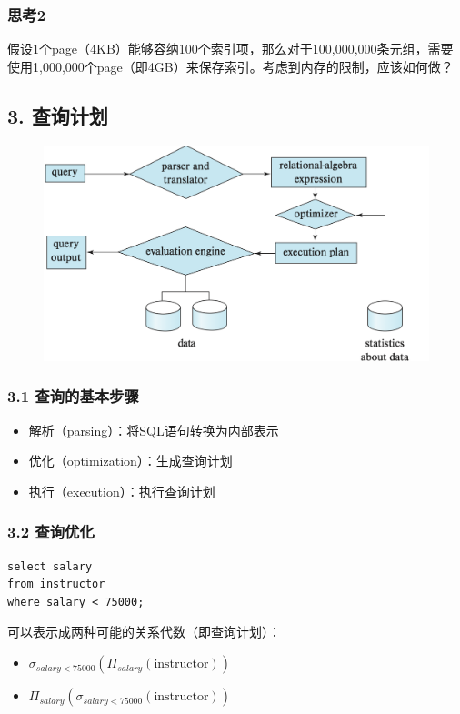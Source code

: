 \documentclass[aspectratio=169, 14pt]{beamer}
\begin{document}
\begin{frame}
	\frametitle{思考2}
	假设1个page（4KB）能够容纳100个索引项，那么对于100,000,000条元组，需要使用1,000,000个page（即4GB）来保存索引。考虑到内存的限制，应该如何做？


\end{frame}

\begin{frame}
	\section{\textcolor{darkmidnightblue}{3. 查询计划}}

	\begin{figure}
		\includegraphics[width=0.8\linewidth]{week11/query}
	\end{figure}
\end{frame}

\begin{frame}
	\frametitle{3.1 查询的基本步骤}
	\begin{itemize}
		\item 解析（parsing）：将SQL语句转换为内部表示
		\item \alert{优化}（optimization）：生成查询计划
		\item 执行（execution）：执行查询计划
	\end{itemize}
\end{frame}

\begin{frame}[fragile]
	\frametitle{3.2 查询优化}

	\begin{verbatim}
select salary
from instructor
where salary < 75000;
  \end{verbatim}

	可以表示成两种可能的关系代数（即查询计划）：

	\begin{itemize}
		\item $\sigma_{salary < 75000}(\Pi_{salary}(\text{instructor}))$
		\item $\Pi_{salary}(\sigma_{salary < 75000}(\text{instructor}))$
	\end{itemize}

\end{frame}
\end{document}
